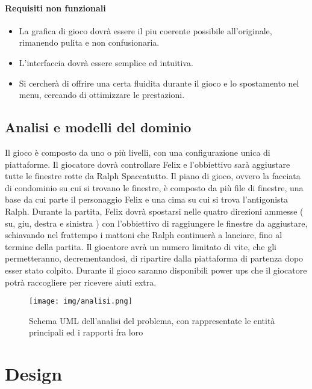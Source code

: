 \subsubsection{Requisiti non funzionali}
\begin{itemize}
	\item La grafica di gioco dovrà essere il piu coerente possibile all’originale, rimanendo pulita e non confusionaria.
	\item L’interfaccia dovrà essere semplice ed intuitiva.
	\item Si cercherà di offrire una certa fluidita durante il gioco e lo spostamento nel menu, cercando di ottimizzare le prestazioni.
\end{itemize}

\section{Analisi e modelli del dominio}
Il gioco è composto da uno o più livelli, con una configurazione unica di piattaforme. 
Il giocatore dovrà controllare Felix e l'obbiettivo sarà aggiustare tutte le finestre rotte da Ralph Spaccatutto.
Il piano di gioco, ovvero la facciata di condominio su cui si trovano le finestre, è composto da più file di finestre, una base da cui parte il personaggio Felix e una cima su cui si trova l'antigonista Ralph.
Durante la partita, Felix dovrà spostarsi nelle quatro direzioni ammesse ( su, giu, destra e sinistra ) con l'obbiettivo di raggiungere le finestre da aggiustare, schiavando nel frattempo i mattoni che Ralph continuerà a lanciare, fino al termine della partita. 
Il giocatore avrà un numero limitato di vite, che gli permetteranno, decrementandosi, di ripartire dalla piattaforma di partenza dopo esser stato colpito. 
Durante il gioco saranno disponibili power ups che il giocatore potrà raccogliere per ricevere aiuti extra.

\begin{figure}[H]
\texttt{[image: img/analisi.png]} 
\centering{}
\caption{Schema UML dell'analisi del problema, con rappresentate le entità principali ed i rapporti fra loro}
\label{img:analisi}
\end{figure}

\chapter{Design}

